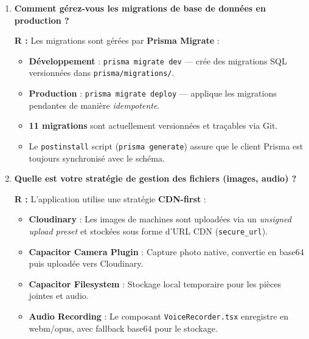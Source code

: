 \documentclass[12pt, a4paper]{article}
\begin{document}
\begin{enumerate}[leftmargin=2em, label=\textbf{Q\arabic*.}]
\textbf{Avantages} : Pas d'infrastructure WebSocket à maintenir, les notifications persistent en base.

\textbf{Roadmap temps réel :}
\begin{itemize}
  \item \textbf{Phase 1} : \textbf{Server-Sent Events (SSE)} via Next.js API Routes pour la notification en temps réel.
  \item \textbf{Phase 2} : \textbf{WebSockets} via \textbf{Socket.io} ou \textbf{Ably} pour la messagerie instantanée.
  \item \textbf{Phase 3} : \textbf{Push Notifications} via \textbf{Firebase Cloud Messaging (FCM)} pour les notifications natives Android.
\end{itemize}

\vspace{0.5em}

\item \textbf{Comment gérez-vous les migrations de base de données en production ?}

\textbf{R :} Les migrations sont gérées par \textbf{Prisma Migrate} :
\begin{itemize}
  \item \textbf{Développement} : \texttt{prisma migrate dev} — crée des migrations SQL versionnées dans \texttt{prisma/migrations/}.
  \item \textbf{Production} : \texttt{prisma migrate deploy} — applique les migrations pendantes de manière \textit{idempotente}.
  \item \textbf{11 migrations} sont actuellement versionnées et traçables via Git.
  \item Le \texttt{postinstall} script (\texttt{prisma generate}) assure que le client Prisma est toujours synchronisé avec le schéma.
\end{itemize}

\vspace{0.5em}

\item \textbf{Quelle est votre stratégie de gestion des fichiers (images, audio) ?}

\textbf{R :} L'application utilise une stratégie \textbf{CDN-first} :
\begin{itemize}
  \item \textbf{Cloudinary} : Les images de machines sont uploadées via un \textit{unsigned upload preset} et stockées sous forme d'URL CDN (\texttt{secure\_url}).
  \item \textbf{Capacitor Camera Plugin} : Capture photo native, convertie en base64 puis uploadée vers Cloudinary.
  \item \textbf{Capacitor Filesystem} : Stockage local temporaire pour les pièces jointes et audio.
  \item \textbf{Audio Recording} : Le composant \texttt{VoiceRecorder.tsx} enregistre en webm/opus, avec fallback base64 pour le stockage.
\end{itemize}


\end{enumerate}
\end{document}
